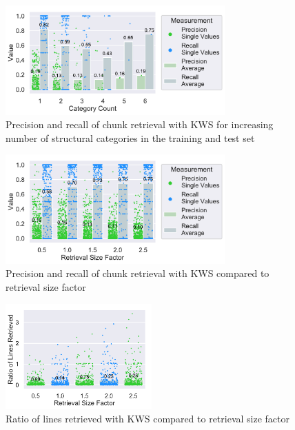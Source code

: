 \documentclass[\myrootdir/main.tex]{subfiles}
\begin{document}
\begin{figure}[htbp]
		\centering
		\includegraphics[width=0.75\textwidth, clip]{img/big-study/recall-precision-categorycount-KWS.pdf}
		\caption{Precision and recall of chunk retrieval with KWS for increasing number of structural categories in the training and test set}
		\label{fig:recall-precision-categorycount-KWS}
\end{figure}

\begin{figure}[htbp]
		\centering
		\includegraphics[width=0.75\textwidth, clip]{img/big-study/contextsizefactor-precision-recall-KWS.pdf}
		\caption{Precision and recall of chunk retrieval with KWS compared to retrieval size factor}
		\label{fig:contextsizefactor-precision-recall-KWS}
\end{figure}


\begin{figure}[htbp]
		\centering
		\includegraphics[width=0.5\textwidth, clip]{img/big-study/retrievalsizefactor-retrievalratio-KWS.pdf}
		\caption{Ratio of lines retrieved with KWS compared to retrieval size factor}
		\label{fig:retrievalsizefactor-retrievalratio-KWS}
\end{figure}
\end{document}
